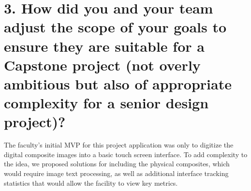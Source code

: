 \documentclass{article}
\begin{document}
\section*{3. How did you and your team adjust the scope of your goals to ensure they are suitable for a Capstone project (not overly ambitious but also of appropriate complexity for a senior design project)?}
The faculty’s initial MVP for this project application was only to digitize the digital composite images into a basic touch screen interface. To add complexity to the idea, we proposed solutions for including the physical composites, which would require image text processing, as well as additional interface tracking statistics that would allow the facility to view key metrics.
\end{document}
